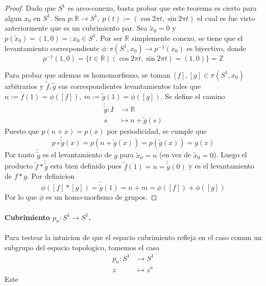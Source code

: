 \begin{proof}
  Dado que \(S^1\) es arco-conexo, basta probar que este teorema es
  cierto para algun \(x_0\) en \(S^1\). Sea \(p : \mathbb R \to S^1,\
  p(t) := (\cos 2 \pi t, \sin 2 \pi t)\) el cual es fue visto anteriormente
  que es un cubrimiento par. Sea \(\tilde x _0 = 0\) y \( p(\tilde x _0) =
  (1,0) =: x_0 \in S^1\). Por ser \(\mathbb R\) simplemente conexo, se
  tiene que el levantamiento correspondiente \(\phi : \pi (S^1, x_0) \to
  p^{-1} (x_0)\) es biyectivo, donde
  \[ p^{-1} (1,0) = \{t \in \mathbb R \mid (\cos 2 \pi t, \sin 2 \pi t)
    = (1, 0) \} = \mathbb Z \]

  Para probar que ademas es homomorfismo, se toman \([f], [g] \in \pi
  (S^1, x_0)\) arbitrarios y \(\tilde f, \tilde g\) sus correspondientes
  levantamientos tales que \(n := \tilde f (1) = \phi ([f]),\ m :=
  \tilde g (1) = \phi ([g])\). Se define el camino
  \begin{align*}
    \tilde{\tilde g} : I &\longrightarrow \mathbb R \\
    s &\longmapsto n + \tilde g (s)
  \end{align*}
  Puesto que \(p(n + x) = p(x)\) por periodicidad, se cumple que
  \[ p \circ \tilde{\tilde g} (x) = p (n + \tilde g (x)) = p (\tilde g
    (x)) = g (x) \]
  Por tanto \(\tilde{\tilde g}\) es el levantamiento de \(g\) para
  \(\tilde x_0 = n\) (en vez de \(\tilde x_0 = 0\)). Luego el producto
  \(\tilde f * \tilde{\tilde g}\) esta bien definido pues \(\tilde f (1)
  = n = \tilde{\tilde g} (0)\) y es el levantamiento de \(f * g\). Por
  definicion
  \[ \phi ([f] * [g]) = \tilde{\tilde g} (1) = n + m = \phi ([f]) + \phi ([g]) \]
  Por lo que \(\phi\) es un homo-morfismo de grupos.
\end{proof}

\paragraph{Cubrimiento \(p_n : S^1 \to S^1\).} Para testear la intuicion
de que el espacio cubrimiento refleja en el caso comun un subgrupo del
espacio topologico, tomemos el caso
\begin{align*}
  p_n : S^1 &\longrightarrow S^1 \\
  z &\longmapsto z^n
\end{align*}
Este

